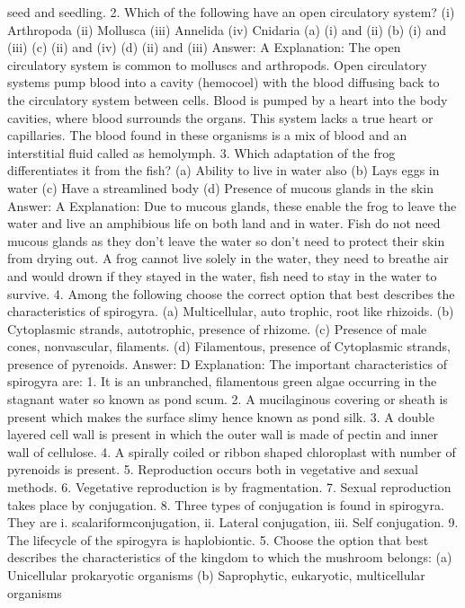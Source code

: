 seed and seedling.
2. Which of the following have an open circulatory system?
(i) Arthropoda
(ii) Mollusca
(iii) Annelida
(iv) Cnidaria
(a) (i) and (ii)
(b) (i) and (iii)
(c) (ii) and (iv)
(d) (ii) and (iii)
Answer: A
Explanation: The open circulatory system is common to molluscs and
arthropods. Open circulatory systems pump blood into a cavity
(hemocoel) with the blood diffusing back to the circulatory system
between cells. Blood is pumped by a heart into the body cavities,
where blood surrounds the organs. This system lacks a true heart or
capillaries. The blood found in these organisms is a mix of blood and
an interstitial fluid called as hemolymph.
3. Which adaptation of the frog differentiates it from the fish?
(a) Ability to live in water also
(b) Lays eggs in water
(c) Have a streamlined body
(d) Presence of mucous glands in the skin
Answer: A
Explanation: Due to mucous glands, these enable the frog to leave
the water and live an amphibious life on both land and in water. Fish
do not need mucous glands as they don’t leave the water so don’t
need to protect their skin from drying out. A frog cannot live solely
in the water, they need to breathe air and would drown if they
stayed in the water, fish need to stay in the water to survive.
4. Among the following choose the correct option that best
describes the characteristics of spirogyra.
(a) Multicellular, auto trophic, root like rhizoids.
(b) Cytoplasmic strands, autotrophic, presence of rhizome.
(c) Presence of male cones, nonvascular, filaments.
(d) Filamentous, presence of Cytoplasmic strands, presence of
pyrenoids.
Answer: D
Explanation: The important characteristics of spirogyra are:
1. It is an unbranched, filamentous green algae occurring in the
stagnant water so known as pond scum.
2. A mucilaginous covering or sheath is present which makes the
surface slimy hence known as pond silk.
3. A double layered cell wall is present in which the outer wall is
made of pectin and inner wall of cellulose.
4. A spirally coiled or ribbon shaped chloroplast with number
of pyrenoids is present.
5. Reproduction occurs both in vegetative and sexual methods.
6. Vegetative reproduction is by fragmentation.
7. Sexual reproduction takes place by conjugation.
8. Three types of conjugation is found in spirogyra. They are
i. scalariformconjugation,
ii. Lateral conjugation,
iii. Self conjugation.
9. The lifecycle of the spirogyra is haplobiontic.
5. Choose the option that best describes the characteristics of
the kingdom to which the mushroom belongs:
(a) Unicellular prokaryotic organisms
(b) Saprophytic, eukaryotic, multicellular organisms
